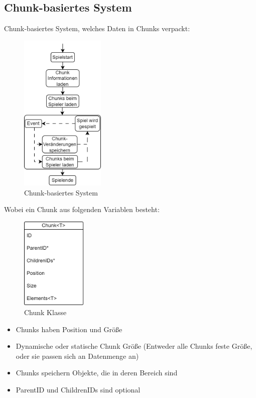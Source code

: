 \subsection{Chunk-basiertes System}
Chunk-basiertes System, welches Daten in Chunks verpackt:
\begin{figure}[htp]
    \centering
    \includegraphics[width=0.36\textwidth]{images/Chunkbasiert.png}
    \caption{Chunk-basiertes System}
    \label{fig:chunkBasedSystem}
\end{figure}

Wobei ein Chunk aus folgenden Variablen besteht:
\begin{figure}[htp]
    \centering
    \includegraphics[width=0.28\textwidth]{images/Chunk.png}
    \caption{Chunk Klasse}
    \label{fig:chunkClass}
\end{figure}

\begin{itemize}
    \item Chunks haben Position und Größe
    \item Dynamische oder statische Chunk Größe (Entweder alle Chunks feste Größe, oder sie passen sich an Datenmenge an)
    \item Chunks speichern Objekte, die in deren Bereich sind
    \item ParentID und ChildrenIDs sind optional
\end{itemize}

